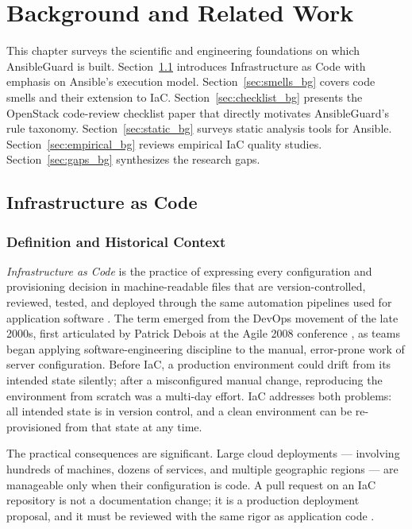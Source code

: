 \chapter{Background and Related Work}
\label{chap:literature}

\noindent
This chapter surveys the scientific and engineering foundations on which
AnsibleGuard is built. Section~\ref{sec:iac_bg} introduces Infrastructure as
Code with emphasis on Ansible's execution model. Section~\ref{sec:smells_bg}
covers code smells and their extension to \ac{IaC}. Section~\ref{sec:checklist_bg}
presents the OpenStack code-review checklist paper that directly motivates
AnsibleGuard's rule taxonomy. Section~\ref{sec:static_bg} surveys static analysis
tools for Ansible. Section~\ref{sec:empirical_bg} reviews empirical \ac{IaC} quality
studies. Section~\ref{sec:gaps_bg} synthesizes the research gaps.

\section{Infrastructure as Code}
\label{sec:iac_bg}

\subsection{Definition and Historical Context}

\textit{Infrastructure as Code} is the practice of expressing every
configuration and provisioning decision in machine-readable files that are
version-controlled, reviewed, tested, and deployed through the same automation
pipelines used for application software \cite{humble2010continuous}. The term
emerged from the DevOps movement of the late 2000s, first articulated by Patrick
Debois at the Agile 2008 conference \cite{debois2008agile}, as teams began
applying software-engineering discipline to the manual, error-prone work of
server configuration. Before \ac{IaC}, a production environment could drift from
its intended state silently; after a misconfigured manual change, reproducing the
environment from scratch was a multi-day effort. \ac{IaC} addresses both problems:
all intended state is in version control, and a clean environment can be
re-provisioned from that state at any time.

\medskip\noindent
The practical consequences are significant. Large cloud deployments —
involving hundreds of machines, dozens of services, and multiple geographic
regions — are manageable only when their configuration is code. A pull request
on an \ac{IaC} repository is not a documentation change; it is a production
deployment proposal, and it must be reviewed with the same rigor as application
code \cite{bessghaier2025iac}.

